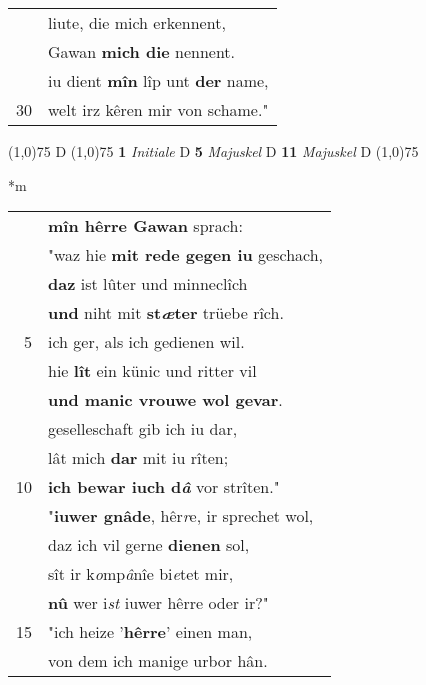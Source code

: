 \documentclass[8pt,a4paper,notitlepage]{article}
\begin{document}
\begin{table}[ht]
\begin{minipage}[t]{0.5\linewidth}
\begin{tabular}{rl}
 & liute, die mich erkennent,\\ 
 & Gawan \textbf{mich die} nennent.\\ 
 & iu dient \textbf{mîn} lîp unt \textbf{der} name,\\ 
30 & welt irz kêren mir von schame."\\ 
\end{tabular}
\scriptsize
\line(1,0){75} \newline
D \newline
\line(1,0){75} \newline
\textbf{1} \textit{Initiale} D  \textbf{5} \textit{Majuskel} D  \textbf{11} \textit{Majuskel} D  \newline
\line(1,0){75} \newline
\newline
\end{minipage}
\hspace{0.5cm}
\begin{minipage}[t]{0.5\linewidth}
\small
\begin{center}*m
\end{center}
\begin{tabular}{rl}
 & \textbf{mîn hêrre Gawan} sprach:\\ 
 & "waz hie \textbf{mit rede gegen iu} geschach,\\ 
 & \textbf{daz} ist lûter und minneclîch\\ 
 & \textbf{und} niht mit \textbf{st\textit{æ}ter} trüebe rîch.\\ 
5 & ich ger, als ich gedienen wil.\\ 
 & hie \textbf{lît} ein künic und ritter vil\\ 
 & \textbf{und manic vrouwe wol gevar}.\\ 
 & geselleschaft gib ich iu dar,\\ 
 & lât mich \textbf{dar} mit iu rîten;\\ 
10 & \textbf{ich bewar iuch d\textit{â}} vor strîten."\\ 
 & "\textbf{iuwer gnâde}, hêr\textit{r}e, ir sprechet wol,\\ 
 & daz ich vil gerne \textbf{dienen} sol,\\ 
 & sît ir k\textit{o}mp\textit{â}nîe bi\textit{e}tet mir,\\ 
 & \textbf{nû} wer i\textit{st} iuwer hêrre oder ir?"\\ 
15 & "ich heize '\textbf{hêrre}' einen man,\\ 
 & von dem ich manige urbor hân.\\ 

\end{tabular}
\end{minipage}
\end{table}
\end{document}
